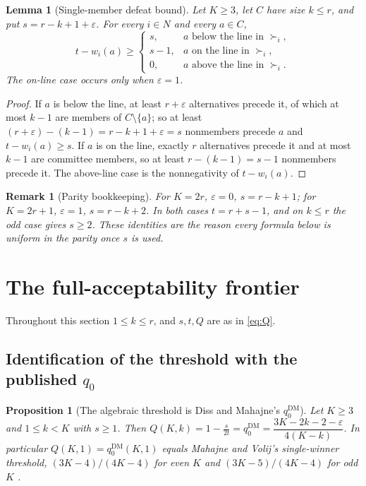 \documentclass[11pt]{article}
\theoremstyle{plain}
\newtheorem{lemma}{Lemma}
\newtheorem{proposition}{Proposition}
\newtheorem{remark}{Remark}
\theoremstyle{definition}
\newcommand{\eps}{\varepsilon}
\newcommand{\DM}{\mathrm{DM}}
\begin{document}
\begin{lemma}[Single-member defeat bound]
\label{lem:single}
Let $K\ge3$, let $C$ have size $k\le r$, and put $s=r-k+1+\eps$. For every $i\in N$ and every $a\in C$,
\[
t-w_i(a)\ge
\begin{cases}
s, & a\text{ below the line in }\succ_i,\\
s-1, & a\text{ on the line in }\succ_i,\\
0, & a\text{ above the line in }\succ_i.
\end{cases}
\]
The on-line case occurs only when $\eps=1$.
\end{lemma}

\begin{proof}
If $a$ is below the line, at least $r+\eps$ alternatives precede it, of which at most $k-1$ are members of $C\setminus\{a\}$; so at least $(r+\eps)-(k-1)=r-k+1+\eps=s$ nonmembers precede $a$ and $t-w_i(a)\ge s$. If $a$ is on the line, exactly $r$ alternatives precede it and at most $k-1$ are committee members, so at least $r-(k-1)=s-1$ nonmembers precede it. The above-line case is the nonnegativity of $t-w_i(a)$.
\end{proof}

\begin{remark}[Parity bookkeeping]
\label{rem:parity}
For $K=2r$, $\eps=0$, $s=r-k+1$; for $K=2r+1$, $\eps=1$, $s=r-k+2$. In both cases $t=r+s-1$, and on $k\le r$ the odd case gives $s\ge2$. These identities are the reason every formula below is uniform in the parity once $s$ is used.
\end{remark}

\section{The full-acceptability frontier}
\label{sec:full}

Throughout this section $1\le k\le r$, and $s,t,Q$ are as in \eqref{eq:Q}.

\subsection{Identification of the threshold with the published $q_0$}

\begin{proposition}[The algebraic threshold is Diss and Mahajne's $q_0^{\DM}$]
\label{prop:identification}
Let $K\ge3$ and $1\le k<K$ with $s\ge1$. Then $Q(K,k)=1-\frac{s}{2t}=q_0^{\DM}=\dfrac{3K-2k-2-\eps}{4(K-k)}$. In particular $Q(K,1)=q_0^{\DM}(K,1)$ equals Mahajne and Volij's single-winner threshold, $(3K-4)/(4K-4)$ for even $K$ and $(3K-5)/(4K-4)$ for odd $K$ \cite{MahajneVolij2019}.
\end{proposition}
\end{document}

